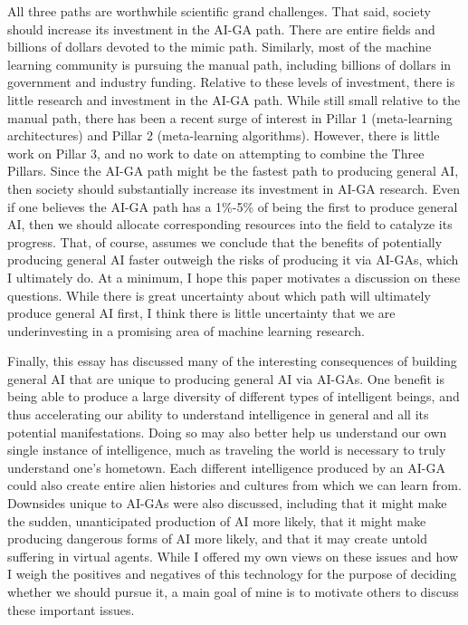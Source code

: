 \documentclass{article}
\begin{document}
All three paths are worthwhile scientific grand challenges. That said, society should increase its investment in the AI-GA path. There are entire fields and billions of dollars devoted to the mimic path. Similarly, most of the machine learning community is pursuing the manual path, including billions of dollars in government and industry funding. Relative to these levels of investment, there is little research and investment in the AI-GA path. While still small relative to the manual path, there has been a recent surge of interest in Pillar 1 (meta-learning architectures) and Pillar 2 (meta-learning algorithms). However, there is little work on Pillar 3, and no work to date on attempting to combine the Three Pillars. Since the AI-GA path might be the fastest path to producing general AI, then society should substantially increase its investment in AI-GA research. Even if one believes the AI-GA path has a 1\%-5\% of being the first to produce general AI, then we should allocate corresponding resources into the field to catalyze its progress. That, of course, assumes we conclude that the benefits of potentially producing general AI faster outweigh the risks of producing it via AI-GAs, which I ultimately do. At a minimum, I hope this paper motivates a discussion on these questions. While there is great uncertainty about which path will ultimately produce general AI first, I think there is little uncertainty that we are underinvesting in a promising area of machine learning research.

Finally, this essay has discussed many of the interesting consequences of building general AI that are unique to producing general AI via AI-GAs. One benefit is being able to produce a large diversity of different types of intelligent beings, and thus accelerating our ability to understand intelligence in general and all its potential manifestations. Doing so may also better help us understand our own single instance of intelligence, much as traveling the world is necessary to truly understand one's hometown. Each different intelligence produced by an AI-GA could also create entire alien histories and cultures from which we can learn from. Downsides unique to AI-GAs were also discussed, including that it might make the sudden, unanticipated production of AI more likely, that it might make producing dangerous forms of AI more likely, and that it may create untold suffering in virtual agents. While I offered my own views on these issues and how I weigh the positives and negatives of this technology for the purpose of deciding whether we should pursue it, a main goal of mine is to motivate others to discuss these important issues. 
\end{document}
